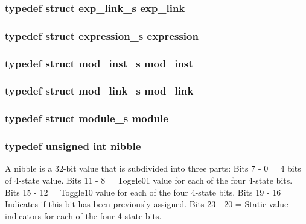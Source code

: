 \subsubsection{\setlength{\rightskip}{0pt plus 5cm}typedef struct {\bf exp\_\-link\_\-s} exp\_\-link}\label{defines_8h_a104}


\subsubsection{\setlength{\rightskip}{0pt plus 5cm}typedef struct {\bf expression\_\-s} expression}\label{defines_8h_a102}


\subsubsection{\setlength{\rightskip}{0pt plus 5cm}typedef struct {\bf mod\_\-inst\_\-s} mod\_\-inst}\label{defines_8h_a112}


\subsubsection{\setlength{\rightskip}{0pt plus 5cm}typedef struct {\bf mod\_\-link\_\-s} mod\_\-link}\label{defines_8h_a107}


\subsubsection{\setlength{\rightskip}{0pt plus 5cm}typedef struct {\bf module\_\-s} module}\label{defines_8h_a106}


\subsubsection{\setlength{\rightskip}{0pt plus 5cm}typedef unsigned int nibble}\label{defines_8h_a99}


A nibble is a 32-bit value that is subdivided into three parts: Bits 7 - 0 = 4 bits of 4-state value. Bits 11 - 8 = Toggle01 value for each of the four 4-state bits. Bits 15 - 12 = Toggle10 value for each of the four 4-state bits. Bits 19 - 16 = Indicates if this bit has been previously assigned. Bits 23 - 20 = Static value indicators for each of the four 4-state bits. 
